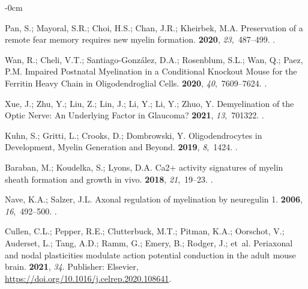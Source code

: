 \documentclass[brainsci, %
               review,submit,pdftex,moreauthors
               ]{Definitions/mdpi}
\begin{document}
\begin{adjustwidth}{-\extralength}{0cm}
\begin{thebibliography}{999}
  Pan, S.; Mayoral, S.R.; Choi, H.S.; Chan, J.R.; Kheirbek, M.A.
  \newblock Preservation of a remote fear memory requires new myelin formation.
   {\bf 2020}, {\em 23},~487--499.
  .
  
  Wan, R.; Cheli, V.T.; Santiago-González, D.A.; Rosenblum, S.L.; Wan, Q.; Paez,
    P.M.
  \newblock Impaired {Postnatal} {Myelination} in a {Conditional} {Knockout}
    {Mouse} for the {Ferritin} {Heavy} {Chain} in {Oligodendroglial} {Cells}.
   {\bf 2020}, {\em 40},~7609--7624.
  .
  
  Xue, J.; Zhu, Y.; Liu, Z.; Lin, J.; Li, Y.; Li, Y.; Zhuo, Y.
  \newblock Demyelination of the {Optic} {Nerve}: {An} {Underlying} {Factor} in
    {Glaucoma}?
   {\bf 2021}, {\em 13},~701322.
  .
  
  Kuhn, S.; Gritti, L.; Crooks, D.; Dombrowski, Y.
  \newblock Oligodendrocytes in {Development}, {Myelin} {Generation} and
    {Beyond}.
   {\bf 2019}, {\em 8},~1424.
  .
  
  Baraban, M.; Koudelka, S.; Lyons, D.A.
  \newblock Ca2+ activity signatures of myelin sheath formation and growth in
    vivo.
   {\bf 2018}, {\em 21},~19--23.
  .
  
  Nave, K.A.; Salzer, J.L.
  \newblock Axonal regulation of myelination by neuregulin 1.
   {\bf 2006}, {\em 16},~492--500.
  .
  
  Cullen, C.L.; Pepper, R.E.; Clutterbuck, M.T.; Pitman, K.A.; Oorschot, V.;
    Auderset, L.; Tang, A.D.; Ramm, G.; Emery, B.; Rodger, J.;  et~al.
  \newblock Periaxonal and nodal plasticities modulate action potential
    conduction in the adult mouse brain.
   {\bf 2021}, {\em 34}.
  \newblock Publisher: Elsevier,
    {\url{https://doi.org/10.1016/j.celrep.2020.108641}}.
  

\end{thebibliography}
\end{adjustwidth}
\end{document}
